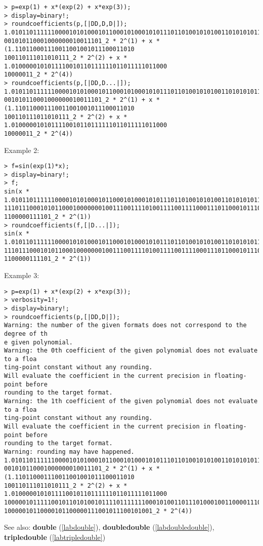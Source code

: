 \begin{center}\begin{minipage}{15cm}\begin{Verbatim}[frame=single]
> p=exp(1) + x*(exp(2) + x*exp(3));
> display=binary!;
> roundcoefficients(p,[|DD,D,D|]);
1.010110111111000010101000101100010100010101110110100101010011010101011111101110
001010110001000000010011101_2 * 2^(1) + x * (1.110110001110011001001011100011010
100110111011010111_2 * 2^(2) + x * 1.0100000101011110010110111111011011111011000
10000011_2 * 2^(4))
> roundcoefficients(p,[|DD,D...|]);
1.010110111111000010101000101100010100010101110110100101010011010101011111101110
001010110001000000010011101_2 * 2^(1) + x * (1.110110001110011001001011100011010
100110111011010111_2 * 2^(2) + x * 1.0100000101011110010110111111011011111011000
10000011_2 * 2^(4))
\end{Verbatim}
\end{minipage}\end{center}
\noindent Example 2: 
\begin{center}\begin{minipage}{15cm}\begin{Verbatim}[frame=single]
> f=sin(exp(1)*x);
> display=binary!;
> f;
sin(x * 1.0101101111110000101010001011000101000101011101101001010100110101010111
11101110001010110001000000010011100111101001111001111000111011000101110011100010
1100000111101_2 * 2^(1))
> roundcoefficients(f,[|D...|]);
sin(x * 1.0101101111110000101010001011000101000101011101101001010100110101010111
11101110001010110001000000010011100111101001111001111000111011000101110011100010
1100000111101_2 * 2^(1))
\end{Verbatim}
\end{minipage}\end{center}
\noindent Example 3: 
\begin{center}\begin{minipage}{15cm}\begin{Verbatim}[frame=single]
> p=exp(1) + x*(exp(2) + x*exp(3));
> verbosity=1!;
> display=binary!;
> roundcoefficients(p,[|DD,D|]);
Warning: the number of the given formats does not correspond to the degree of th
e given polynomial.
Warning: the 0th coefficient of the given polynomial does not evaluate to a floa
ting-point constant without any rounding.
Will evaluate the coefficient in the current precision in floating-point before 
rounding to the target format.
Warning: the 1th coefficient of the given polynomial does not evaluate to a floa
ting-point constant without any rounding.
Will evaluate the coefficient in the current precision in floating-point before 
rounding to the target format.
Warning: rounding may have happened.
1.010110111111000010101000101100010100010101110110100101010011010101011111101110
001010110001000000010011101_2 * 2^(1) + x * (1.110110001110011001001011100011010
100110111011010111_2 * 2^(2) + x * 1.0100000101011110010110111111011011111011000
10000010111110010110101001011110111111100010100110111010001001100001110100011100
10000010110000101100000111001011100101001_2 * 2^(4))
\end{Verbatim}
\end{minipage}\end{center}
See also: \textbf{double} (\ref{labdouble}), \textbf{doubledouble} (\ref{labdoubledouble}), \textbf{tripledouble} (\ref{labtripledouble})
